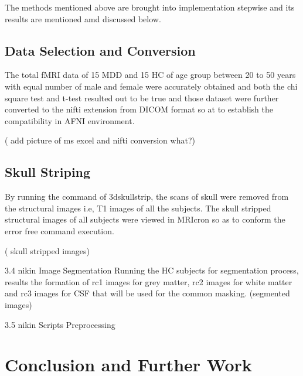 \documentclass{article}
\begin{document}
The methods mentioned above are brought into implementation stepwise
and its results are mentioned amd discussed below.

\subsection{Data Selection and Conversion}

The total fMRI data of 15 MDD and 15 HC of age group between 20 to 50
years with equal number of male and female were accurately obtained
and both the chi square test and t-test resulted out to be true and
those dataset were further converted to the nifti extension from DICOM
format so at to establish the compatibility in AFNI environment.


( add picture of ms excel and nifti conversion what?)

\subsection{Skull Striping}

By running the command of 3dskullstrip, the
scans of skull were removed from the structural images i.e, T1 images
of all the subjects. The skull stripped structural images of all
subjects were viewed in MRIcron so as to conform the error free
command execution.


( skull stripped images)

3.4 nikin Image Segmentation Running the HC subjects for segmentation
process, results the formation of rc1 images for grey matter, rc2
images for white matter and rc3 images for CSF that will be used for
the common masking. (segmented images)

3.5 nikin Scripts Preprocessing

\section{Conclusion and Further Work}
\end{document}
